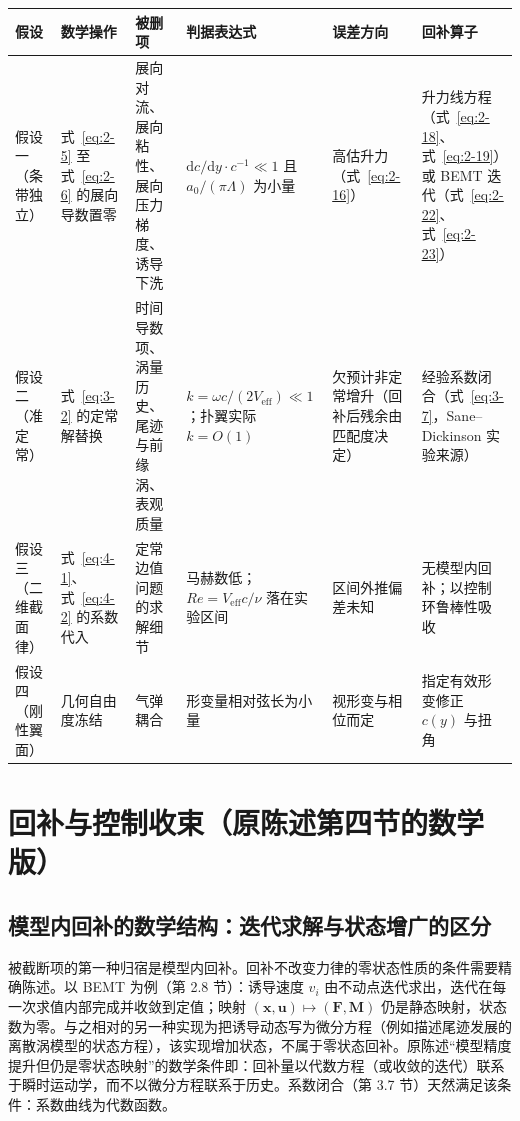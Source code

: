 \documentclass[11pt,a4paper]{ctexart}
\numberwithin{equation}{section}
\begin{document}
\begin{table}[htbp]
  \centering
  \footnotesize
  \begin{tabularx}{\textwidth}{@{} >{\raggedright\arraybackslash}p{1.9cm} >{\raggedright\arraybackslash}X >{\raggedright\arraybackslash}X >{\raggedright\arraybackslash}p{3.3cm} >{\raggedright\arraybackslash}X >{\raggedright\arraybackslash}X @{}}
    \toprule
    假设 & 数学操作 & 被删项 & 判据表达式 & 误差方向 & 回补算子 \\
    \midrule
    假设一（条带独立） & 式~\eqref{eq:2-5} 至式~\eqref{eq:2-6} 的展向导数置零 & 展向对流、展向粘性、展向压力梯度、诱导下洗 & $\mathrm{d}c/\mathrm{d}y \cdot c^{-1} \ll 1$ 且 $a_0/(\pi\Lambda)$ 为小量 & 高估升力（式~\eqref{eq:2-16}） & 升力线方程（式~\eqref{eq:2-18}、式~\eqref{eq:2-19}）或 BEMT 迭代（式~\eqref{eq:2-22}、式~\eqref{eq:2-23}） \\
    假设二（准定常） & 式~\eqref{eq:3-2} 的定常解替换 & 时间导数项、涡量历史、尾迹与前缘涡、表观质量 & $k = \omega c/(2V_{\text{eff}}) \ll 1$；扑翼实际 $k = O(1)$ & 欠预计非定常增升（回补后残余由匹配度决定） & 经验系数闭合（式~\eqref{eq:3-7}，Sane--Dickinson 实验来源） \\
    假设三（二维截面律） & 式~\eqref{eq:4-1}、式~\eqref{eq:4-2} 的系数代入 & 定常边值问题的求解细节 & 马赫数低；$Re = V_{\text{eff}} c/\nu$ 落在实验区间 & 区间外推偏差未知 & 无模型内回补；以控制环鲁棒性吸收 \\
    假设四（刚性翼面） & 几何自由度冻结 & 气弹耦合 & 形变量相对弦长为小量 & 视形变与相位而定 & 指定有效形变修正 $c(y)$ 与扭角 \\
    \bottomrule
  \end{tabularx}
\end{table}

\section{回补与控制收束（原陈述第四节的数学版）}\label{sec:backfill}

\subsection{模型内回补的数学结构：迭代求解与状态增广的区分}

被截断项的第一种归宿是模型内回补。回补不改变力律的零状态性质的条件需要精确陈述。以 BEMT 为例（第 2.8 节）：诱导速度 $v_i$ 由不动点迭代求出，迭代在每一次求值内部完成并收敛到定值；映射 $(\bm{x}, \bm{u}) \mapsto (\bm{F}, \bm{M})$ 仍是静态映射，状态数为零。与之相对的另一种实现为把诱导动态写为微分方程（例如描述尾迹发展的离散涡模型的状态方程），该实现增加状态，不属于零状态回补。原陈述“模型精度提升但仍是零状态映射”的数学条件即：回补量以代数方程（或收敛的迭代）联系于瞬时运动学，而不以微分方程联系于历史。系数闭合（第 3.7 节）天然满足该条件：系数曲线为代数函数。
\end{document}
